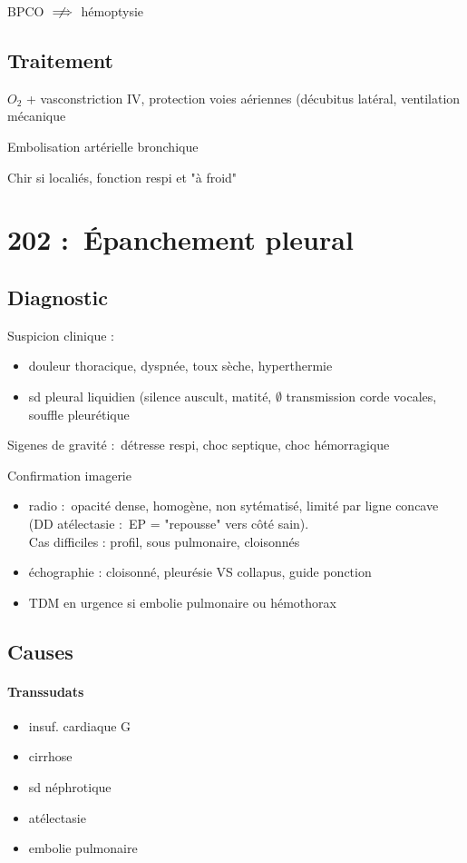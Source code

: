 \danger BPCO $\centernot\implies$ hémoptysie

\subsection{Traitement}
$O_2$ + vasconstriction IV, protection voies aériennes (décubitus latéral,
ventilation mécanique

Embolisation artérielle bronchique

Chir si localiés, fonction respi et "à froid"




\section{202 : Épanchement pleural}%
\label{sec:epanchement_pleural}

\subsection{Diagnostic}
Suspicion clinique :
\begin{itemize}
  \item douleur thoracique, dyspnée, toux sèche, hyperthermie
  \item sd pleural liquidien (silence auscult, matité, $\emptyset$ transmission
    corde vocales, souffle pleurétique
\end{itemize}
Sigenes de gravité : détresse respi, choc septique, choc hémorragique

Confirmation imagerie
\begin{itemize}
  \item radio : opacité dense, homogène, non sytématisé, limité par ligne
    concave (DD atélectasie : EP = "repousse" vers côté sain). \\
    Cas difficiles : profil, sous pulmonaire, cloisonnés
  \item échographie : cloisonné, pleurésie VS collapus, guide ponction
  \item TDM en urgence si embolie pulmonaire ou hémothorax
\end{itemize}

\subsection{Causes}
\paragraph{Transsudats}
\begin{itemize}
  \item insuf. cardiaque G
  \item cirrhose
  \item sd néphrotique
  \item atélectasie
  \item embolie pulmonaire
\end{itemize}

